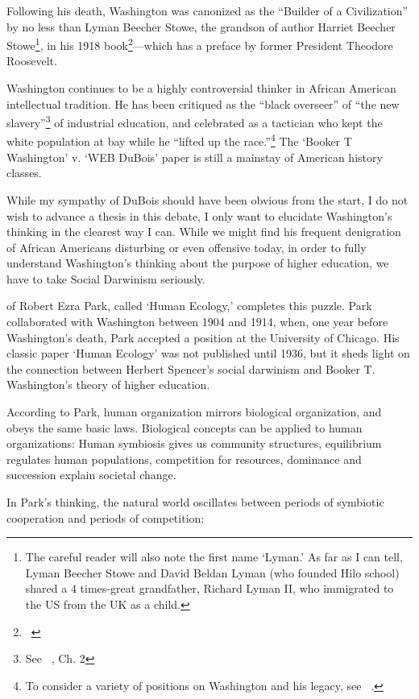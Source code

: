 Following his death, Washington was canonized as the ``Builder of a Civilization'' by no less than Lyman Beecher Stowe, the grandson of author Harriet Beecher Stowe\footnote{The careful reader will also note the first name `Lyman.' As far as I can tell, Lyman Beecher Stowe and David Beldan Lyman (who founded Hilo school) shared a 4 times-great grandfather, Richard Lyman II, who immigrated to the US from the UK as a child.}, in his 1918 book\footnote{~\citep{Scott:2016vda}}---which has a preface by former President Theodore Roosevelt.

Washington continues to be a highly controversial thinker in African American intellectual tradition. He has been critiqued as the ``black overseer'' of ``the new slavery''\footnote{See ~\citep{Spivey:1978un}, Ch. 2} of industrial education, and celebrated as a tactician who kept the white population at bay while he ``lifted up the race.''\footnote{To consider a variety of positions on Washington and his legacy, see ~\citep{Cunnigen:2006wx}.} The `Booker T Washington' v. `WEB DuBois' paper is still a mainstay of American history classes. 

While my sympathy of DuBois should have been obvious from the start, I do not wish to advance a thesis in this debate, I only want to elucidate Washington's thinking in the clearest way I can. While we might find his frequent denigration of African Americans disturbing or even offensive today, in order to fully understand Washington's thinking about the purpose of higher education, we have to take Social Darwinism seriously. 

 of Robert Ezra Park, called `Human Ecology,' completes this puzzle. Park collaborated with Washington between 1904 and 1914, when, one year before Washington's death, Park accepted a position at the University of Chicago. His classic paper `Human Ecology' was not published until 1936, but it sheds light on the connection between Herbert Spencer's social darwinism and Booker T. Washington's theory of higher education.

According to Park, human organization mirrors biological organization, and obeys the same basic laws. Biological concepts can be applied to human organizations: Human symbiosis gives us community structures, equilibrium regulates human populations, competition for resources, dominance and succession explain societal change. 

In Park's thinking, the natural world oscillates between periods of symbiotic cooperation and periods of competition:

